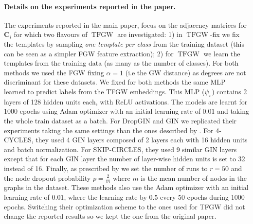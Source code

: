 \documentclass{article}
\def\mC{{\bm{C}}}
\newcommand{\TFGW}{\operatorname{TFGW}}
\begin{document}
{\paragraph{Details on the experiments reported in the paper.}  The experiments reported in the main paper, focus on the adjacency
matrices for $\mC_i$ for which two flavours of $\TFGW$ are investigated: 1) in $\TFGW$-fix we fix the
templates by sampling \emph{one template per class} from the training dataset (this can be seen as a simpler FGW feature extraction);
2) for $\TFGW$ we learn the templates from the training
data (as many as the number of classes). For both methods we used the FGW fixing $\alpha=1$ (i.e the GW distance) as degrees are not discriminant for these datasets. We fixed for both methods the same MLP learned to predict labels from the TFGW embeddings. This MLP ($\psi_v$) contains 2 layers of 128 hidden units each, with ReLU activations. The models are learnt for 1000 epochs using Adam optimizer with an initial learning rate of 0.01 and taking the whole train dataset as a batch. For DropGIN \cite{papp2021dropgnn} and GIN \cite{xu2018powerful} we replicated their experiments taking the same settings than the ones described by \cite{papp2021dropgnn}. For 4-CYCLES, they used 4 GIN layers composed of 2 layers each with 16 hidden units and batch normalization. For SKIP-CIRCLES, they used 9 similar GIN layers except that for each GIN layer the number of layer-wise hidden units is set to 32 instead of 16. Finally, as prescribed by \cite{papp2021dropgnn} we set the number of runs to $r=50$ and the node dropout probability $p=\frac{2}{m}$ where $m$ is the mean number of nodes in the graphs in the dataset. These methods also use the Adam optimizer with an initial learning rate of $0.01$, where the learning rate by 0.5 every 50 epochs during 1000 epochs. Switching their optimization scheme to the ones used for TFGW did not change the reported results so we kept the one from the original paper.
\begin{table}[!t]
	\centering
	\caption{Statistics on real datasets considered in our benchmark.}
	\label{tab:data_statistics}
\end{table}}
\end{document}
